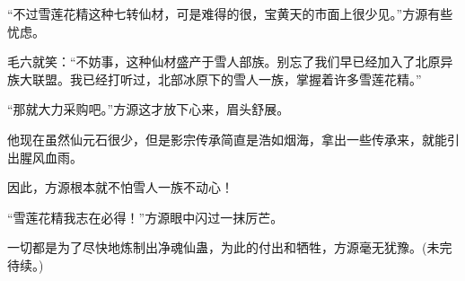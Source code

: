 \begin{this_body}
“不过雪莲花精这种七转仙材，可是难得的很，宝黄天的市面上很少见。”方源有些忧虑。

毛六就笑：“不妨事，这种仙材盛产于雪人部族。别忘了我们早已经加入了北原异族大联盟。我已经打听过，北部冰原下的雪人一族，掌握着许多雪莲花精。”

“那就大力采购吧。”方源这才放下心来，眉头舒展。

他现在虽然仙元石很少，但是影宗传承简直是浩如烟海，拿出一些传承来，就能引出腥风血雨。

因此，方源根本就不怕雪人一族不动心！

“雪莲花精我志在必得！”方源眼中闪过一抹厉芒。

一切都是为了尽快地炼制出净魂仙蛊，为此的付出和牺牲，方源毫无犹豫。(未完待续。)

\end{this_body}


